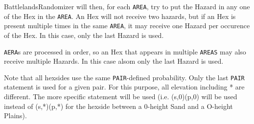 \documentclass{article}
\begin{document}
BattlelandsRandomizer will then, for each \texttt{AREA}, try to put the
Hazard in any one of the Hex in the \texttt{AREA}. An Hex will not receive
two hazards, but if an Hex is present multiple times in the same
\texttt{AREA}, it may receive one Hazard per occurence of the Hex. In this
case, only the last Hazard is used.

\texttt{AERA}s are processed in order, so an Hex that appears in multiple
\texttt{AREAS} may also receive multiple Hazards. In this case alsom
only the last Hazard is used.

Note that all hexsides use the same \texttt{PAIR}-defined probability. Only the
last \texttt{PAIR} statement is used for a given pair. For this purpose, all
elevation including * are different. The more specific statement will
be used (i.e. (s,0)(p,0) will be used instead of (s,*)(p,*) for
the hexside between a 0-height Sand and a O-height Plains).
\end{document}
